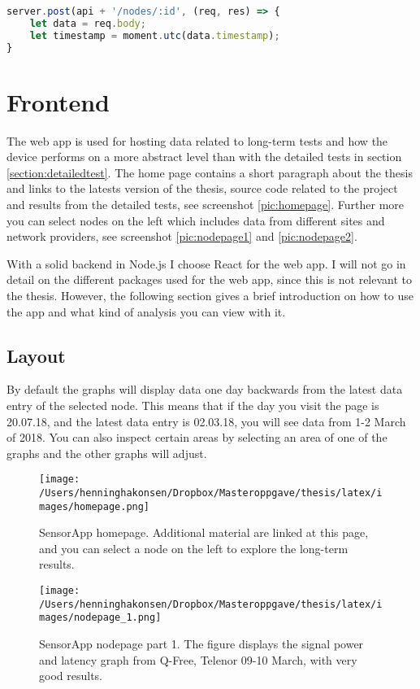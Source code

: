\documentclass[USenglish]{ifimaster}  %
\begin{document}
\begin{lstlisting}[caption={Simple moment example},label={code:moment},language=JavaScript]
server.post(api + '/nodes/:id', (req, res) => {
    let data = req.body;
    let timestamp = moment.utc(data.timestamp);
}
\end{lstlisting}

\newpage
\section{Frontend}
The web app is used for hosting data related to long-term tests and how the device performs on a more abstract level than with the detailed tests in section \vref{section:detailedtest}. The home page contains a short paragraph about the thesis and links to the latests version of the thesis, source code related to the project and results from the detailed tests, see screenshot \vref{pic:homepage}. Further more you can select nodes on the left which includes data from different sites and network providers, see screenshot \vref{pic:nodepage1} and \vref{pic:nodepage2}.

With a solid backend in Node.js I choose React for the web app. I will not go in detail on the different packages used for the web app, since this is not relevant to the thesis. However, the following section gives a brief introduction on how to use the app and what kind of analysis you can view with it.

\subsection{Layout} \label{sssection:layout}
By default the graphs will display data one day backwards from the latest data entry of the selected node. This means that if the day you visit the page is 20.07.18, and the latest data entry is 02.03.18, you will see data from 1-2 March of 2018. You can also inspect certain areas by selecting an area of one of the graphs and the other graphs will adjust.

\begin{figure}[H]
  \centering
  \texttt{[image: /Users/henninghakonsen/Dropbox/Masteroppgave/thesis/latex/images/homepage.png]}
  \caption[SensorApp homepage]{SensorApp homepage. Additional material are linked at this page, and you can select a node on the left to explore the long-term results.}
  \label{pic:homepage}
\end{figure}

\begin{figure}[H]
  \centering
  \texttt{[image: /Users/henninghakonsen/Dropbox/Masteroppgave/thesis/latex/images/nodepage\_1.png]}
  \caption[SensorApp nodepage part 1]{SensorApp nodepage part 1. The figure displays the signal power and latency graph from Q-Free, Telenor 09-10 March, with very good results.}
  \label{pic:nodepage1}
\end{figure}
\end{document}
